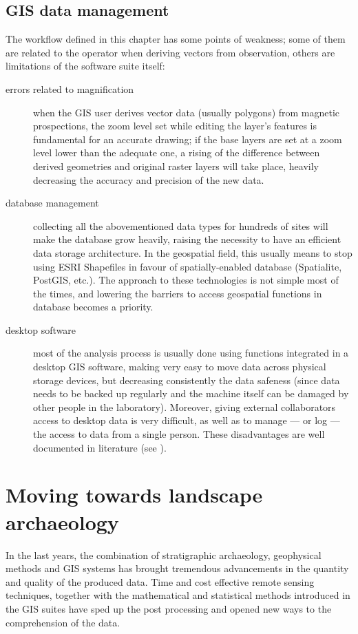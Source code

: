         \subsection{GIS data management}
        \label{sec:gis-data-management}
            The workflow defined in this chapter has some points of weakness; some of them are related to the operator when deriving vectors from observation, others are limitations of the software suite itself:
            \begin{description}
                \item[errors related to magnification] when the GIS user derives vector data (usually polygons) from magnetic prospections, the zoom level set while editing the layer's features is fundamental for an accurate drawing; if the base layers are set at a zoom level lower than the adequate one, a rising of the difference between derived geometries and original raster layers will take place, heavily decreasing the accuracy and precision of the new data.
                \item[database management] collecting all the abovementioned data types for hundreds of sites will make the database grow heavily, raising the necessity to have an efficient data storage architecture. In the geospatial field, this usually means to stop using ESRI Shapefiles in favour of spatially-enabled database (Spatialite, PostGIS, etc.). The approach to these technologies is not simple most of the times, and lowering the barriers to access geospatial functions in database becomes a priority.
                \item[desktop software] most of the analysis process is usually done using functions integrated in a desktop GIS software, making very easy to move data across physical storage devices, but decreasing consistently the data safeness (since data needs to be backed up regularly and the machine itself can be damaged by other people in the laboratory). Moreover, giving external collaborators access to desktop data is very difficult, as well as to manage --- or log --- the access to data from a single person. These disadvantages are well documented in literature (see \cite[p.~19]{fronza-informatica}).
            \end{description}

    \section{Moving towards landscape archaeology}
    \label{sec:landscape}
        In the last years, the combination of stratigraphic archaeology, geophysical methods and GIS systems has brought tremendous advancements in the quantity and quality of the produced data. Time and cost effective remote sensing techniques, together with the mathematical and statistical methods introduced in the GIS suites have sped up the post processing and opened new ways to the comprehension of the data.

